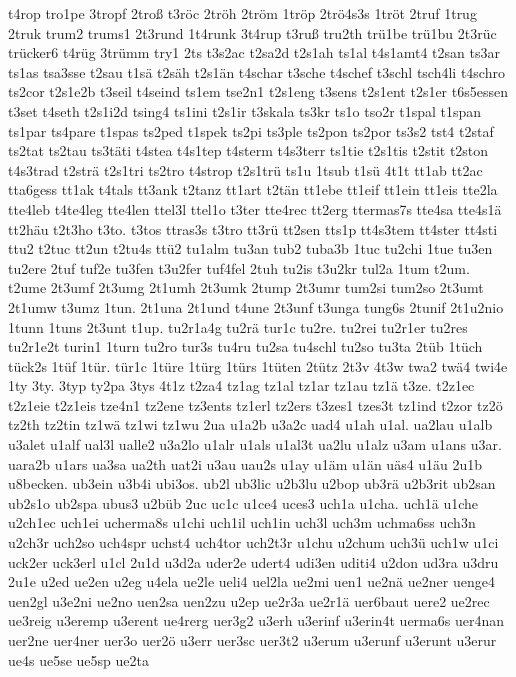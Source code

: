 {t4rop
tro1pe
3tropf
2troß
t3röc
2tröh
2tröm
1tröp
2trö4s3s
1tröt
2truf
1trug
2truk
trum2
trums1
2t3rund
1t4runk
3t4rup
t3ruß
tru2th
trü1be
trü1bu
2t3rüc
trücker6
t4rüg
3trümm
try1
2ts
t3s2ac
t2sa2d
t2s1ah
ts1al
t4s1amt4
t2san
ts3ar
ts1as
tsa3sse
t2sau
t1sä
t2säh
t2s1än
t4schar
t3sche
t4schef
t3schl
tsch4li
t4schro
ts2cor
t2s1e2b
t3seil
t4seind
ts1em
tse2n1
t2s1eng
t3sens
t2s1ent
t2s1er
t6s5essen
t3set
t4seth
t2s1i2d
tsing4
ts1ini
t2s1ir
t3skala
ts3kr
ts1o
tso2r
t1spal
t1span
ts1par
ts4pare
t1spas
ts2ped
t1spek
ts2pi
ts3ple
ts2pon
ts2por
ts3s2
tst4
t2staf
ts2tat
ts2tau
ts3täti
t4stea
t4s1tep
t4sterm
t4s3terr
ts1tie
t2s1tis
t2stit
t2ston
t4s3trad
t2strä
t2s1tri
ts2tro
t4strop
t2s1trü
ts1u
1tsub
t1sü
4t1t
tt1ab
tt2ac
tta6gess
tt1ak
t4tals
tt3ank
t2tanz
tt1art
t2tän
tt1ebe
tt1eif
tt1ein
tt1eis
tte2la
tte4leb
t4te4leg
tte4len
ttel3l
ttel1o
t3ter
tte4rec
tt2erg
ttermas7s
tte4sa
tte4s1ä
tt2häu
t2t3ho
t3to.
t3tos
ttras3s
t3tro
tt3rü
tt2sen
tts1p
tt4s3tem
tt4ster
tt4sti
ttu2
t2tuc
tt2un
t2tu4s
ttü2
tu1alm
tu3an
tub2
tuba3b
1tuc
tu2chi
1tue
tu3en
tu2ere
2tuf
tuf2e
tu3fen
t3u2fer
tuf4fel
2tuh
tu2is
t3u2kr
tul2a
1tum
t2um.
t2ume
2t3umf
2t3umg
2t1umh
2t3umk
2tump
2t3umr
tum2si
tum2so
2t3umt
2t1umw
t3umz
1tun.
2t1una
2t1und
t4une
2t3unf
t3unga
tung6s
2tunif
2t1u2nio
1tunn
1tuns
2t3unt
t1up.
tu2r1a4g
tu2rä
tur1c
tu2re.
tu2rei
tu2r1er
tu2res
tu2r1e2t
turin1
1turn
tu2ro
tur3s
tu4ru
tu2sa
tu4schl
tu2so
tu3ta
2tüb
1tüch
tück2s
1tüf
1tür.
tür1c
1türe
1türg
1türs
1tüten
2tütz
2t3v
4t3w
twa2
twä4
twi4e
1ty
3ty.
3typ
ty2pa
3tys
4t1z
t2za4
tz1ag
tz1al
tz1ar
tz1au
tz1ä
t3ze.
t2z1ec
t2z1eie
t2z1eis
tze4n1
tz2ene
tz3ents
tz1erl
tz2ers
t3zes1
tzes3t
tz1ind
t2zor
tz2ö
tz2th
tz2tin
tz1wä
tz1wi
tz1wu
2ua
u1a2b
u3a2c
uad4
u1ah
u1al.
ua2lau
u1alb
u3alet
u1alf
ual3l
ualle2
u3a2lo
u1alr
u1als
u1al3t
ua2lu
u1alz
u3am
u1ans
u3ar.
uara2b
u1ars
ua3sa
ua2th
uat2i
u3au
uau2s
u1ay
u1äm
u1än
uäs4
u1äu
2u1b
u8becken.
ub3ein
u3b4i
ubi3os.
ub2l
ub3lic
u2b3lu
u2bop
ub3rä
u2b3rit
ub2san
ub2s1o
ub2spa
ubus3
u2büb
2uc
uc1c
u1ce4
uces3
uch1a
u1cha.
uch1ä
u1che
u2ch1ec
uch1ei
ucherma8s
u1chi
uch1il
uch1in
uch3l
uch3m
uchma6ss
uch3n
u2ch3r
uch2so
uch4spr
uchst4
uch4tor
uch2t3r
u1chu
u2chum
uch3ü
uch1w
u1ci
uck2er
uck3erl
u1cl
2u1d
u3d2a
uder2e
udert4
udi3en
uditi4
u2don
ud3ra
u3dru
2u1e
u2ed
ue2en
u2eg
u4ela
ue2le
ueli4
uel2la
ue2mi
uen1
ue2nä
ue2ner
uenge4
uen2gl
u3e2ni
ue2no
uen2sa
uen2zu
u2ep
ue2r3a
ue2r1ä
uer6baut
uere2
ue2rec
ue3reig
u3eremp
u3erent
ue4rerg
uer3g2
u3erh
u3erinf
u3erin4t
uerma6s
uer4nan
uer2ne
uer4ner
uer3o
uer2ö
u3err
uer3sc
uer3t2
u3erum
u3erunf
u3erunt
u3erur
ue4s
ue5se
ue5sp
ue2ta
}
